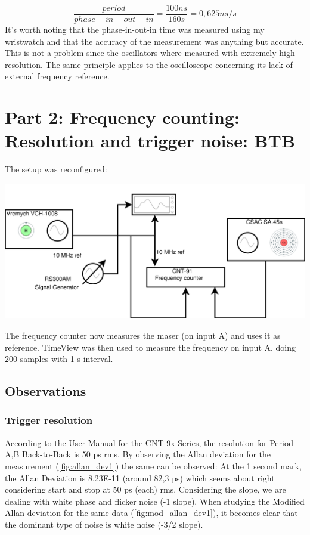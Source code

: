\documentclass[11pt,english,a4paper]{article}
\begin{document}
\begin{displaymath}
\frac{period}{phase-in-out-in} = \frac{100 ns}{160 s} = 0,625 ns/s
\end{displaymath}
\newline
It's worth noting that the phase-in-out-in time was measured using my wristwatch and that the accuracy of the measurement was anything but accurate. This is not a problem since the oscillators where measured with extremely high resolution.
The same principle applies to the oscilloscope concerning its lack of external frequency reference.   
\newpage

\section{Part 2: Frequency counting: Resolution and trigger noise: BTB}
The setup was reconfigured:
\begin{center}
\includegraphics[width=1 \textwidth]{lab_report_diagram_del2.pdf}
\end{center}
The frequency counter now measures the maser (on input A) and uses it as reference. TimeView was then used to measure the frequency on input A, doing 200 samples with 1 s interval.

\subsection{Observations}
\subsubsection{Trigger resolution}
According to the User Manual for the CNT 9x Series, the resolution for Period A,B Back-to-Back is 50 ps rms. By observing the Allan deviation for the measurement (\ref{fig:allan_dev1}) the same can be observed: At the 1 second mark, the Allan Deviation is 8.23E-11 (around 82,3 ps) which seems about right considering start and stop at 50 ps (each) rms. Considering the slope, we are dealing with white phase and flicker noise (-1 slope). When studying the Modified Allan deviation for the same data (\ref{fig:mod_allan_dev1}), it becomes clear that the dominant type of noise is white noise (-3/2 slope).
\end{document}
